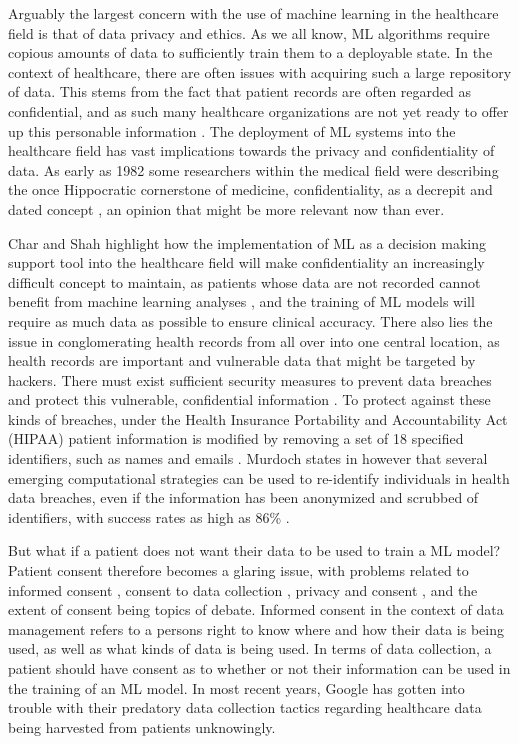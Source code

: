 \documentclass[12pt]{article}
\begin{document}
Arguably the largest concern with the use of machine learning in the healthcare field is that of data privacy and ethics. As we all know, ML algorithms require copious amounts of data to sufficiently train them to a deployable state. In the context of healthcare, there are often issues with acquiring such a large repository of data. This stems from the fact that patient records are often regarded as confidential, and as such many healthcare organizations are not yet ready to offer up this personable information \cite{Khan_2023}. The deployment of ML systems into the healthcare field has vast implications towards the privacy and confidentiality of data. As early as 1982 some researchers within the medical field were describing the once Hippocratic cornerstone of medicine, confidentiality, as a decrepit and dated concept \cite{Siegler_1982}, an opinion that might be more relevant now than ever.\

Char and Shah highlight how the implementation of ML as a decision making support tool into the healthcare field will make confidentiality an increasingly difficult concept to maintain, as patients whose data are not recorded cannot benefit from machine learning analyses \cite{Char_2018}, and the training of ML models will require as much data as possible to ensure clinical accuracy. There also lies the issue in conglomerating health records from all over into one central location, as health records are important and vulnerable data that might be targeted by hackers. There must exist sufficient security measures to prevent data breaches and protect this vulnerable, confidential information \cite{Khan_2023,Ali_2023}. To protect against these kinds of breaches, under the Health Insurance Portability and Accountability Act (HIPAA) patient information is modified by removing a set of 18 specified identifiers, such as names and emails \cite{Price_2019}. Murdoch states in \cite{Murdoch_2021} however that several emerging computational strategies can be used to re-identify individuals in health data breaches, even if the information has been anonymized and scrubbed of identifiers, with success rates as high as 86\% \cite{Murdoch_2021,Check_Hayden_2013,Gymrek_2013,Erlich_2018,Ji_2019}.  \


But what if a patient does not want their data to be used to train a ML model? Patient consent therefore becomes a glaring issue, with problems related to informed consent \cite{Gerke_2020,Guan_2019}, consent to data collection \cite{Gerke_2020,Ali_2023,Murdoch_2021}, privacy and consent \cite{Murdoch_2021}, and the extent of consent \cite{Racine_2019,Price_2019} being topics of debate. Informed consent in the context of data management refers to a persons right to know where and how their data is being used, as well as what kinds of data is being used. In terms of data collection, a patient should have consent as to whether or not their information can be used in the training of an ML model. In most recent years, Google has gotten into trouble with their predatory data collection tactics regarding healthcare data being harvested from patients unknowingly.\
\end{document}
